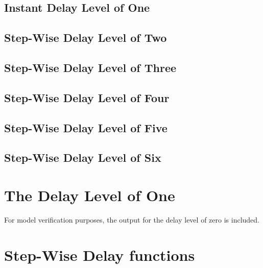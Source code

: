 \subsection{Instant Delay Level of One}

\subsection{Step-Wise Delay Level of Two}

\subsection{Step-Wise Delay Level of Three}

\subsection{Step-Wise Delay Level of Four}

\subsection{Step-Wise Delay Level of Five}

\subsection{Step-Wise Delay Level of Six}



\section{The Delay Level of One}
For model verification purposes, the output for the delay level of zero is included.

\begin{small}
\end{small}






\section{Step-Wise Delay functions}













